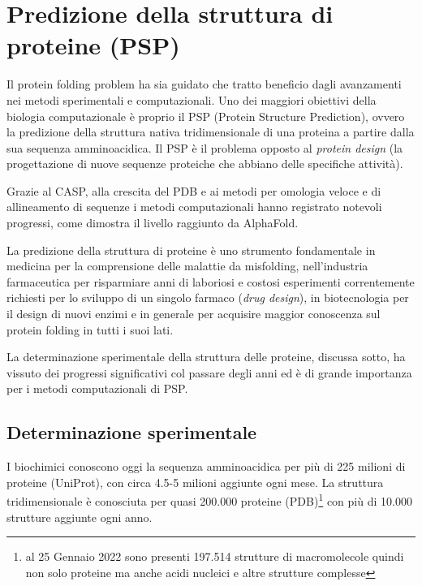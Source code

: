 \chapter{Predizione della struttura di proteine (PSP)}

Il protein folding problem ha sia guidato che tratto beneficio dagli avanzamenti nei metodi sperimentali e computazionali\supercite{dill2008protein}. Uno dei maggiori obiettivi della biologia computazionale è proprio il PSP (Protein Structure Prediction), ovvero la predizione della struttura nativa tridimensionale di una proteina a partire dalla sua sequenza amminoacidica. Il PSP è il problema opposto al \textit{protein design} (la progettazione di nuove sequenze proteiche che abbiano delle specifiche attività).

\par Grazie al CASP, alla crescita del PDB e ai metodi per omologia veloce e di allineamento di sequenze i metodi computazionali hanno registrato notevoli progressi, come dimostra il livello raggiunto da AlphaFold. 

\par La predizione della struttura di proteine è uno strumento fondamentale in medicina per la comprensione delle malattie da misfolding, nell'industria farmaceutica per risparmiare anni di laboriosi e costosi esperimenti correntemente richiesti per lo sviluppo di un singolo farmaco (\textit{drug design}), in biotecnologia per il design di nuovi enzimi e in generale per acquisire maggior conoscenza sul protein folding in tutti i suoi lati.

\par La determinazione sperimentale della struttura delle proteine, discussa sotto, ha vissuto dei progressi significativi col passare degli anni ed è di grande importanza per i metodi computazionali di PSP.

\section{Determinazione sperimentale} \label{sec:experimentally-guided-prediction}

I biochimici conoscono oggi la sequenza amminoacidica per più di 225 milioni di proteine\supercite{proteienDBentries} (UniProt), con circa 4.5-5 milioni aggiunte ogni mese. La struttura tridimensionale è conosciuta per quasi 200.000 proteine\supercite{proteienDBentries} (PDB)\footnote{al 25 Gennaio 2022 sono presenti 197.514 strutture di macromolecole quindi non solo proteine ma anche acidi nucleici e altre strutture complesse\supercite{pdbStats}} con più di 10.000 strutture aggiunte ogni anno. 

